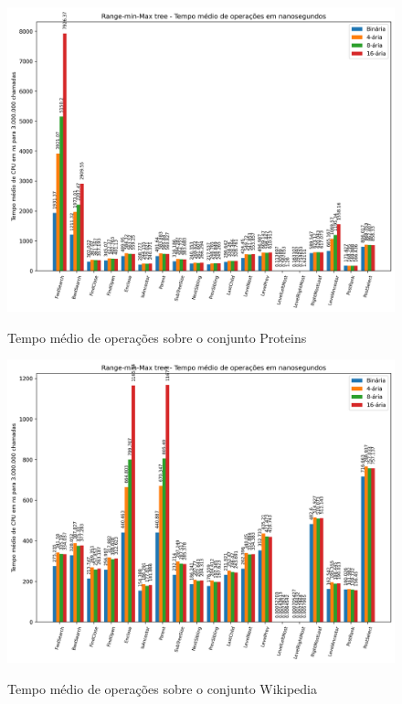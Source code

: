 \begin{figure}[!ht]
    \centering
      \caption[Operações sobre o conjunto de dado proteins]{Tempo médio de operações sobre o conjunto Proteins}{
          \includegraphics[scale=0.8, angle=270]{images/prot_i3000000.png}
        }
        \label{fig:prot}
\end{figure}

\begin{figure}[!ht]
    \centering
      \caption[Operações sobre o conjunto de dado wikipedia]{Tempo médio de operações sobre o conjunto Wikipedia}{
          \includegraphics[scale=0.8, angle=270]{images/wiki_i3000000.png}
        }
        \label{fig:wiki}
\end{figure}
